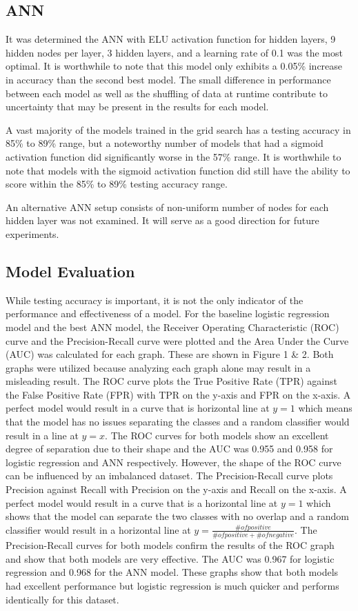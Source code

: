 \documentclass[letterpaper, 12 pt, conference]{ieeeconf}  %
\begin{document}
\subsection{ANN}
It was determined the ANN with ELU activation function for hidden layers, 9 hidden nodes per layer, 3 hidden layers, and a learning rate of 0.1 was the most optimal. It is worthwhile to note that this model only exhibits a 0.05\% increase in accuracy than the second best model. The small difference in performance between each model as well as the shuffling of data at runtime contribute to uncertainty that may be present in the results for each model.

A vast majority of the models trained in the grid search has a testing accuracy in 85\% to 89\% range, but a noteworthy number of models that had a sigmoid activation function did significantly worse in the 57\% range. It is worthwhile to note that models with the sigmoid activation function did still have the ability to score within the 85\% to 89\% testing accuracy range.

An alternative ANN setup consists of non-uniform number of nodes for each hidden layer was not examined. It will serve as a good direction for future experiments.

\subsection{Model Evaluation}

While testing accuracy is important, it is not the only indicator of the performance and effectiveness of a model. For the baseline logistic regression model and the best ANN model, the Receiver Operating Characteristic (ROC) curve and the Precision-Recall curve were plotted and the Area Under the Curve (AUC) was calculated for each graph. These are shown in Figure 1 \& 2. Both graphs were utilized because analyzing each graph alone may result in a misleading result. The ROC curve plots the True Positive Rate (TPR) against the False Positive Rate (FPR) with TPR on the y-axis and FPR on the x-axis. A perfect model would result in a curve that is horizontal line at $y=1$ which means that the model has no issues separating the classes and a random classifier would result in a line at $y=x$. The ROC curves for both models show an excellent degree of separation due to their shape and the AUC was 0.955 and 0.958 for logistic regression and ANN respectively. However, the shape of the ROC curve can be influenced by an imbalanced dataset. The Precision-Recall curve plots Precision against Recall with Precision on the y-axis and Recall on the x-axis. A perfect model would result in a curve that is a horizontal line at $y=1$ which shows that the model can separate the two classes with no overlap and a random classifier would result in a horizontal line at $y = \frac{\# of positive}{\# of positive + \# of negative}$. The Precision-Recall curves for both models confirm the results of the ROC graph and show that both models are very effective. The AUC was 0.967 for logistic regression and 0.968 for the ANN model. These graphs show that both models had excellent performance but logistic regression is much quicker and performs identically for this dataset. 
\end{document}
